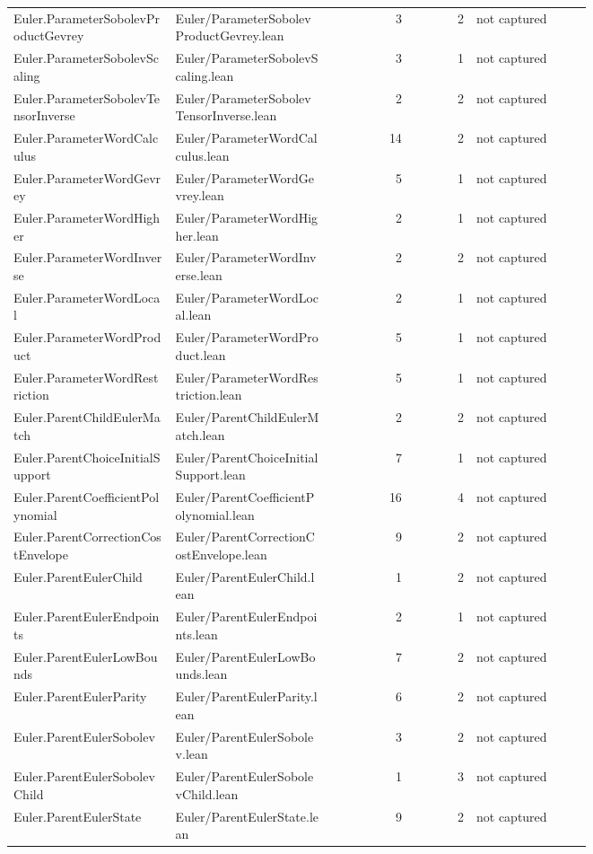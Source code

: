 \documentclass[10pt]{article}
\begin{document}
\begin{longtable}{p{0.28\linewidth}p{0.27\linewidth}r r p{0.20\linewidth}}
Euler.ParameterSobolevProductGevrey & Euler/ParameterSobolevProductGevrey.lean & 3 & 2 & not captured\\
Euler.ParameterSobolevScaling & Euler/ParameterSobolevScaling.lean & 3 & 1 & not captured\\
Euler.ParameterSobolevTensorInverse & Euler/ParameterSobolevTensorInverse.lean & 2 & 2 & not captured\\
Euler.ParameterWordCalculus & Euler/ParameterWordCalculus.lean & 14 & 2 & not captured\\
Euler.ParameterWordGevrey & Euler/ParameterWordGevrey.lean & 5 & 1 & not captured\\
Euler.ParameterWordHigher & Euler/ParameterWordHigher.lean & 2 & 1 & not captured\\
Euler.ParameterWordInverse & Euler/ParameterWordInverse.lean & 2 & 2 & not captured\\
Euler.ParameterWordLocal & Euler/ParameterWordLocal.lean & 2 & 1 & not captured\\
Euler.ParameterWordProduct & Euler/ParameterWordProduct.lean & 5 & 1 & not captured\\
Euler.ParameterWordRestriction & Euler/ParameterWordRestriction.lean & 5 & 1 & not captured\\
Euler.ParentChildEulerMatch & Euler/ParentChildEulerMatch.lean & 2 & 2 & not captured\\
Euler.ParentChoiceInitialSupport & Euler/ParentChoiceInitialSupport.lean & 7 & 1 & not captured\\
Euler.ParentCoefficientPolynomial & Euler/ParentCoefficientPolynomial.lean & 16 & 4 & not captured\\
Euler.ParentCorrectionCostEnvelope & Euler/ParentCorrectionCostEnvelope.lean & 9 & 2 & not captured\\
Euler.ParentEulerChild & Euler/ParentEulerChild.lean & 1 & 2 & not captured\\
Euler.ParentEulerEndpoints & Euler/ParentEulerEndpoints.lean & 2 & 1 & not captured\\
Euler.ParentEulerLowBounds & Euler/ParentEulerLowBounds.lean & 7 & 2 & not captured\\
Euler.ParentEulerParity & Euler/ParentEulerParity.lean & 6 & 2 & not captured\\
Euler.ParentEulerSobolev & Euler/ParentEulerSobolev.lean & 3 & 2 & not captured\\
Euler.ParentEulerSobolevChild & Euler/ParentEulerSobolevChild.lean & 1 & 3 & not captured\\
Euler.ParentEulerState & Euler/ParentEulerState.lean & 9 & 2 & not captured\\

\end{longtable}
\end{document}
